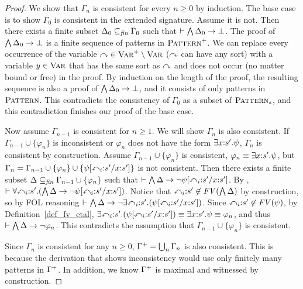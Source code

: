 \documentclass{amsart}
\begin{document}
\begin{proof}
We show that $\Gamma_n$ is consistent
for every $n \ge 0$ by induction.
The base case is to show
$\Gamma_0$ is consistent in the extended signature.
Assume it is not.
Then there exists a finite subset
$\Delta_0 \subseteq_{\mathit{fin}} \Gamma_0$ such that
$\vdash \bigwedge \Delta_0 \to \bot$.
The proof of $\bigwedge \Delta_0 \to \bot$
is a finite sequence of patterns in $\textnormal{\textsc{Pattern}}^+$.
We can replace every occurrence of the variable $\mathbb{y} \in \textnormal{\textsc{Var}}^+ \setminus \textnormal{\textsc{Var}}$
($\mathbb{y}$ can have any sort)
with a variable $y \in \textnormal{\textsc{Var}}$ that 
has the same sort as $\mathbb{y}$ and
does not occur
(no matter bound or free)
in the proof.
By induction on the length of the proof,
the resulting sequence is also a proof of
$\bigwedge \Delta_0 \to \bot$,
and it consists of only patterns in $\textnormal{\textsc{Pattern}}$.
This contradicts the consistency of $\Gamma_0$
as a subset of $\textnormal{\textsc{Pattern}}_s$,
and this contradiction finishes our proof of the base case.

Now assume $\Gamma_{n-1}$ is consistent for $n \ge 1$.
We will show $\Gamma_n$ is also consistent.
If $\Gamma_{n-1} \cup \{ \varphi_n \}$ is inconsistent
or $\varphi_n$ does not have the form $\exists x {:} s' . \psi$,
$\Gamma_n$ is consistent by construction.
Assume $\Gamma_{n-1} \cup \{ \varphi_n \}$ is consistent,
$\varphi_n \equiv \exists x {:} s' . \psi$,
but
$\Gamma_n = 
 \Gamma_{n-1} 
 \cup \{ \varphi_n \} 
 \cup \{ \psi[\mathbb{x}_i {:} s' /x {:} s'] \}$
is not consistent.
Then there exists a finite subset 
$\Delta \subseteq_{\mathit{fin}} \Gamma_{n-1} \cup \{\varphi_n\}$
such that 
$\vdash \bigwedge \Delta \to \neg \psi[\mathbb{x}_i {:} s' /x {:} s']$.
By \universalgeneralization,
$\vdash 
 \forall \mathbb{x}_i {:} s'. 
 (\bigwedge \Delta \to \neg \psi[\mathbb{x}_i {:} s' /x {:} s'])$.
Notice that $\mathbb{x}_i {:} s' \not\in \mathit{FV}(\bigwedge \Delta)$
by construction,
so by FOL reasoning
$\vdash 
 \bigwedge \Delta 
 \to \neg \exists \mathbb{x}_i {:} s' . (\psi[\mathbb{x}_i{:} s' /x{:} s' ])$.
Since $\mathbb{x}_i {:} s' \not\in \mathit{FV}(\psi)$,
by Definition~\ref{def_fv_etal},
$\exists \mathbb{x}_i {:} s' . (\psi[\mathbb{x}_i{:} s' /x{:} s' ]) \equiv \exists x 
{:} s' . \psi \equiv \varphi_n$, 
and thus $\vdash \bigwedge \Delta \to \neg \varphi_n$.
This contradicts the assumption
that $\Gamma_{n-1} \cup \{\varphi_n\}$ is consistent.

Since $\Gamma_n$ is consistent for any $n \ge 0$, 
$\Gamma^+ = \bigcup_n \Gamma_n$
is also consistent.
This is because the derivation 
that shows inconsistency would use only finitely many
patterns in $\Gamma^+$.
In addition, we know $\Gamma^+$ is maximal and witnessed by construction.
\end{proof}
\end{document}
